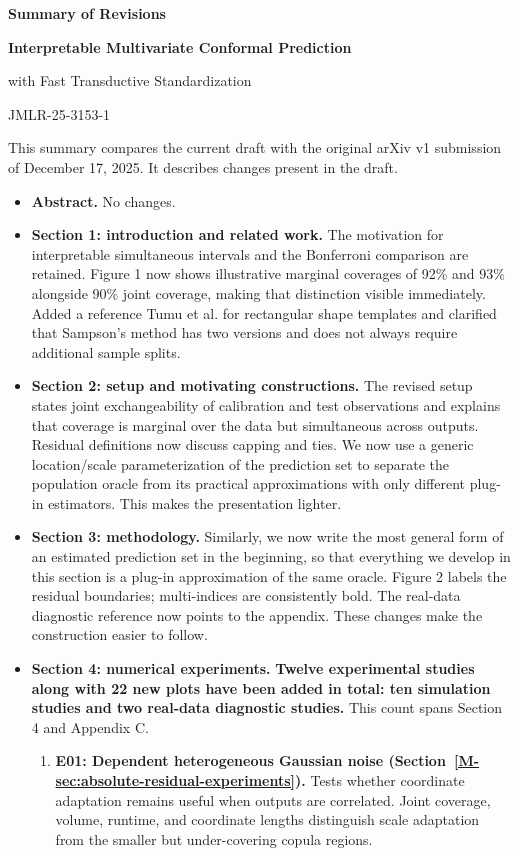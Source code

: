 \documentclass[10pt]{article}
\newcommand{\mssec}[1]{Section~\ref*{M-#1}}
\begin{document}
\begin{center}
{\Large\bfseries Summary of Revisions}\par
\vspace{0.3em}
{\bfseries Interpretable Multivariate Conformal Prediction\par
with Fast Transductive Standardization}\par
JMLR-25-3153-1
\end{center}

This summary compares the current draft with the original arXiv v1
submission of December 17, 2025. It describes changes present in the draft.

\begin{itemize}
\item \textbf{Abstract.} No changes.

\item \textbf{Section 1: introduction and related work.} The motivation for
interpretable simultaneous intervals and the Bonferroni comparison are
retained. Figure 1 now shows illustrative marginal coverages of 92\% and
93\% alongside 90\% joint coverage, making that distinction visible
immediately. Added a reference Tumu et al. for rectangular shape templates and clarified that Sampson's method has two versions and does not always require additional sample splits.

\item \textbf{Section 2: setup and motivating constructions.} The revised
setup states joint exchangeability of calibration and test observations
and explains that coverage is marginal over the data but simultaneous
across outputs. Residual definitions now discuss capping and ties. We now use a generic
location/scale parameterization of the prediction set to separate the population oracle from its
practical approximations with only different plug-in estimators. This makes the presentation lighter.

\item \textbf{Section 3: methodology.} Similarly, we now write the most general form of an estimated prediction set in the beginning, so that everything we develop in this section is a plug-in approximation of the same oracle. Figure 2 labels
the residual boundaries; multi-indices are consistently bold. The
real-data diagnostic reference now points to the appendix. These changes
make the construction easier to follow.

\item \textbf{Section 4: numerical experiments.}
\textbf{Twelve experimental studies along with 22 new plots have been added in total: ten simulation
studies and two real-data diagnostic studies.} This count spans Section 4
and Appendix C. 
\begin{enumerate}
    \item \textbf{E01: Dependent heterogeneous Gaussian noise (\mssec{sec:absolute-residual-experiments}).}
Tests whether coordinate adaptation remains useful when outputs are correlated. Joint coverage, volume, runtime, and coordinate lengths distinguish scale adaptation from the smaller but under-covering copula regions.


\end{enumerate}
\end{itemize}
\end{document}
